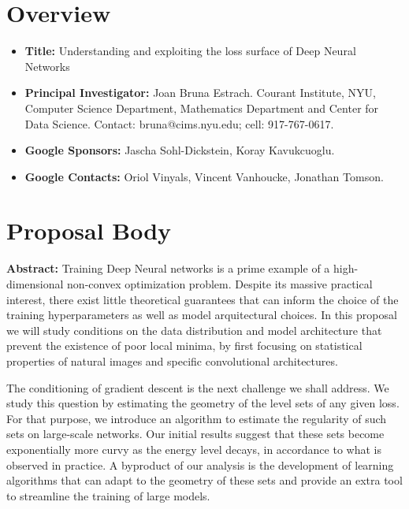 \documentclass[10pt]{article}
\begin{document}


\section*{Overview}
\begin{itemize}
\item \textbf{Title:} Understanding and exploiting the loss surface of Deep Neural Networks  
\item \textbf{Principal Investigator: } Joan Bruna Estrach. Courant Institute, NYU, Computer Science Department, Mathematics Department and Center for Data Science. Contact: bruna@cims.nyu.edu; cell: 917-767-0617. 
\item \textbf{Google Sponsors:} Jascha Sohl-Dickstein, Koray Kavukcuoglu.
\item \textbf{Google Contacts:} Oriol Vinyals, Vincent Vanhoucke, Jonathan Tomson.
\end{itemize}

\section*{Proposal Body}

\textbf{Abstract:}
Training Deep Neural networks is a prime example of a high-dimensional non-convex 
optimization problem. Despite its massive practical interest, there exist little theoretical 
guarantees that can inform the choice of the training hyperparameters as well as model 
arquitectural choices. In this proposal we will study conditions 
on the data distribution and model architecture that prevent the existence 
of poor local minima, by first focusing on statistical properties of natural images
and specific convolutional architectures.
 
The conditioning of gradient descent is the next challenge we shall address. 
We study this question by estimating the geometry of the level sets of any given
loss. For that purpose, 
we introduce an algorithm to estimate the regularity of such sets on large-scale networks. 
Our initial results suggest that these sets become exponentially more curvy 
as the energy level decays, in accordance to what is observed in practice. 
A byproduct of our analysis is the development of learning algorithms that can adapt 
to the geometry of these sets and provide an extra tool to streamline the training of
large models.
\end{document}
